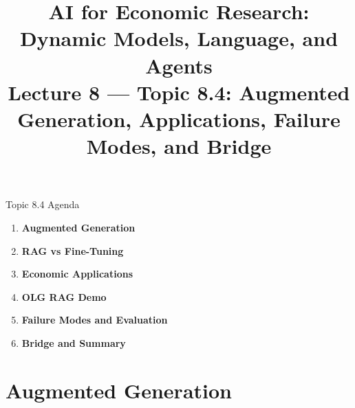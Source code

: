 


\usetikzlibrary{arrows.meta, positioning, shapes.geometric, fit, calc, backgrounds}

\graphicspath{{./pic/}{./figures/}{../../MiniCourse_8hr/Slides/Module4_Agentic_AI/pic/}{../}}

\title[AI for Econ Research]{AI for Economic Research: Dynamic Models, Language, and Agents\\
Lecture 8 --- Topic 8.4: Augmented Generation, Applications, Failure Modes, and Bridge}



\makebeamertitle

\begin{frame}{Topic 8.4 Agenda}
\begin{enumerate}
  \item \textbf{Augmented Generation}
  \medskip
  \item \textbf{RAG vs Fine-Tuning}
  \medskip
  \item \textbf{Economic Applications}
  \medskip
  \item \textbf{OLG RAG Demo}
  \medskip
  \item \textbf{Failure Modes and Evaluation}
  \medskip
  \item \textbf{Bridge and Summary}
\end{enumerate}
\end{frame}

\section{Augmented Generation}

